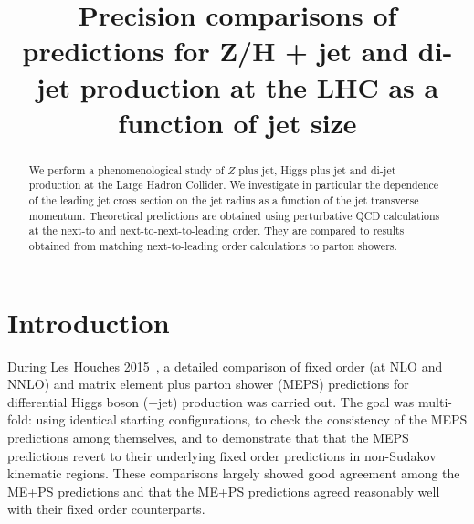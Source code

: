 \documentclass[aps,prd,onecolumn,fleqn,superscriptaddress,groupedaddress,nofootinbib,preprintnumbers,nobalancelastpage]{revtex4}
\begin{document}
\title{Precision comparisons of predictions for Z/H + jet
and di-jet production at the LHC as a function of jet size}

  
\begin{abstract}
  We perform a phenomenological study of
  $Z$ plus jet, Higgs plus jet and di-jet production
  at the Large Hadron Collider. We investigate in particular
  the dependence of the leading jet cross section on the
  jet radius as a function of the jet transverse momentum. 
  Theoretical predictions are obtained using perturbative QCD
  calculations at the next-to and next-to-next-to-leading order.
  They are compared to results obtained from matching 
  next-to-leading order calculations to parton showers.
\end{abstract}

\maketitle
\section{Introduction}
During Les Houches 2015~\cite{Badger:2016bpw}, a detailed 
comparison of fixed order (at NLO and NNLO) and matrix element plus parton shower (MEPS) predictions for differential Higgs
boson (+jet) production was carried out. The goal was multi-fold: using identical
starting configurations, to check the consistency of the MEPS
predictions among themselves, and to demonstrate that that the MEPS
predictions revert to their underlying fixed order predictions in
non-Sudakov kinematic regions. 
These comparisons largely showed good agreement among the ME+PS predictions and 
 that the ME+PS predictions agreed reasonably well with their fixed order counterparts. 
\end{document}
